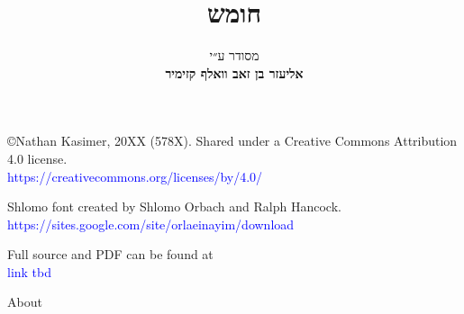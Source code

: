 \documentclass[twoside, openany, parskip=half, 11pt]{book}
\begin{document}
	
	\title{  חומש \\
		
		\vspace{.5in}
	}
	
	\author{מסודר ע״י
		\\
		\textbf{אליעזר בן זאב וואלף קזימיר}}
	
	\maketitle
	
	\begin{minipage}{\textwidth}
		\begin{english}
			\raggedright
			
			©Nathan Kasimer, 20XX (578X). Shared under a Creative Commons Attribution 4.0 license.\\
			\textcolor{blue}{https://creativecommons.org/licenses/by/4.0/}\\ \vspace{\baselineskip}
			
			
			Shlomo font created by Shlomo Orbach and Ralph Hancock.\\ \textcolor{blue}{https://sites.google.com/site/orlaeinayim/download}\\ \vspace{\baselineskip}
			
			Full \XeLaTeX \quad source and PDF can be found at\\ \textcolor{blue}{link tbd}\\ \vspace{\baselineskip}
			
			
		\end{english}
	\end{minipage}
	
	\begin{minipage}{\textwidth}
		
		\begin{english}
			\begin{center} %
				\begin{LARGE}
					About
				\end{LARGE}
			\end{center}
			

			
			
		\end{english}
		
	\end{minipage}
	
\end{document}
